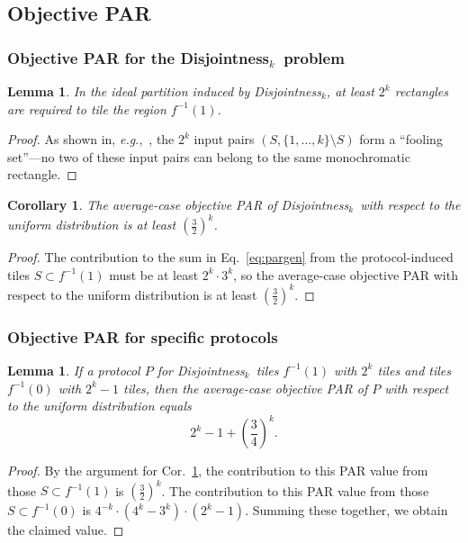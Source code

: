 \documentclass{article}
\theoremstyle{theorem}
\newtheorem{cor}[theorem]{Corollary}
\newtheorem{lemma}[theorem]{Lemma}
\theoremstyle{definition}
\theoremstyle{remark}
\newcommand{\eg}{\emph{e.g.}}
\newcommand{\disjoint}{{\sc Dis\-joint\-ness}\ensuremath{_k}}
\begin{document}
\subsection{Objective PAR}

\subsubsection{Objective PAR for the \disjoint\ problem}

\begin{lemma}
In the ideal partition induced by \disjoint, at least $2^k$ rectangles are required to tile the region $f^{-1}(1)$.
\end{lemma}
\begin{proof}
As shown in, \eg,~\cite{KN97}, the $2^k$ input pairs $(S,\{1,\ldots,k\}\setminus S)$ form a ``fooling set''---no two of these input pairs can belong to the same monochromatic rectangle.
\end{proof}

\begin{cor}\label{cor:dis-pardis}
The average-case objective PAR of \disjoint\ with respect to the uniform distribution is at least $\left(\frac{3}{2}\right)^k$.
\end{cor}
\begin{proof}
The contribution to the sum in Eq.~\ref{eq:pargen} from the protocol-induced tiles $S\subset f^{-1}(1)$ must be at least $2^k\cdot 3^k$, so the average-case objective PAR with respect to the uniform distribution is at least $\left(\frac{3}{2}\right)^k$.
\end{proof}


\subsubsection{Objective PAR for specific protocols}

\begin{lemma}\label{lem:dis-par}
If a protocol $P$ for \disjoint\ tiles $f^{-1}(1)$ with $2^k$ tiles and tiles $f^{-1}(0)$ with $2^k - 1$ tiles, then the average-case objective PAR of $P$ with respect to the uniform distribution equals
\[
2^k -1 + \left(\frac{3}{4}\right)^k.
\]
\end{lemma}
\begin{proof}
By the argument for Cor.~\ref{cor:dis-pardis}, the contribution to this PAR value from those $S\subset f^{-1}(1)$ is $\left(\frac{3}{2}\right)^k$.  The contribution to this PAR value from those $S\subset f^{-1}(0)$ is $4^{-k}\cdot (4^k-3^k)\cdot (2^k-1)$.  Summing these together, we obtain the claimed value.
\end{proof}
\end{document}
